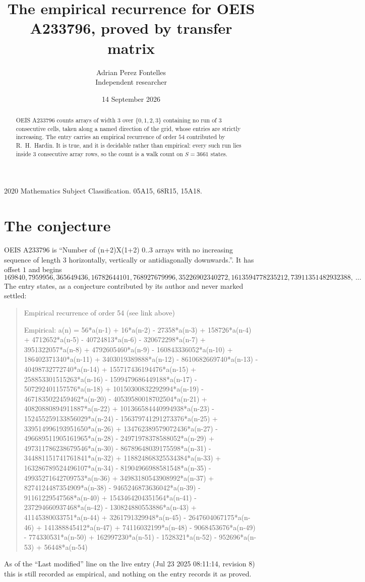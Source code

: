 \documentclass[11pt,a4paper]{article}
\title{The empirical recurrence for OEIS A233796, proved by transfer matrix}
\author{Adrian Perez Fontelles\\ \small Independent researcher}
\date{14 September 2026}
\theoremstyle{plain}
\theoremstyle{definition}
\begin{document}
\maketitle

\begin{abstract}
OEIS A233796 counts arrays of width $3$ over $\{0,1,2,3\}$ containing no run of $3$ consecutive
cells, taken along a named direction of the grid, whose entries are strictly increasing. The entry carries
an empirical recurrence of order $54$ contributed by R.~H.~Hardin. It is true, and it is
decidable rather than empirical: every such run lies inside $3$ consecutive array rows, so
the count is a walk count on $S=3661$ states.
\end{abstract}

\noindent\small 2020 Mathematics Subject Classification. 05A15, 68R15, 15A18.\normalsize

\section{The conjecture}

OEIS A233796 is ``Number of (n+2)X(1+2) 0..3 arrays with no increasing sequence of length 3 horizontally, vertically or antidiagonally downwards.''. It has offset $1$ and begins
\[
169840, 7959956, 365649436, 16782644101, 768927679996, 35226902340272, 1613594778235212, 73911351482932388,\ \dots
\]
The entry states, as a conjecture contributed by its author and never marked settled:
\begin{quote}
Empirical recurrence of order 54 (see link above)

Empirical: a(n) = 56*a(n-1) + 16*a(n-2) - 27358*a(n-3) + 158726*a(n-4) + 4712652*a(n-5) - 40724813*a(n-6) - 320672298*a(n-7) + 3951322057*a(n-8) + 4792605460*a(n-9) - 160843336052*a(n-10) + 186402371340*a(n-11) + 3403019389888*a(n-12) - 8610682669740*a(n-13) - 40498732772740*a(n-14) + 155717436194476*a(n-15) + 258853301515263*a(n-16) - 1599479686449188*a(n-17) - 507292401157576*a(n-18) + 10150300832292994*a(n-19) - 4671835022459462*a(n-20) - 40539580018702504*a(n-21) + 40820880894911887*a(n-22) + 101366584440994938*a(n-23) - 152455259133856029*a(n-24) - 156379741291273376*a(n-25) + 339514996193951650*a(n-26) + 134762389579072436*a(n-27) - 496689511905161965*a(n-28) - 24971978378588052*a(n-29) + 497311786238679546*a(n-30) - 86789648039175598*a(n-31) - 344881151741761841*a(n-32) + 118824868325534384*a(n-33) + 163286789524496107*a(n-34) - 81904966988581548*a(n-35) - 49935271642709753*a(n-36) + 34983180543908992*a(n-37) + 8274124487354909*a(n-38) - 9465246873636042*a(n-39) - 91161229547568*a(n-40) + 1543464204351564*a(n-41) - 237294660937468*a(n-42) - 130824880553886*a(n-43) + 41145380033751*a(n-44) + 3261791329948*a(n-45) - 2647604067175*a(n-46) + 141388845412*a(n-47) + 74116032199*a(n-48) - 9068453676*a(n-49) - 774330531*a(n-50) + 162997230*a(n-51) - 1528321*a(n-52) - 952696*a(n-53) + 56448*a(n-54)
\end{quote}
As of the ``Last modified'' line on the live entry (Jul 23 2025 08:11:14, revision 8) this is still
recorded as empirical, and nothing on the entry records it as proved.
\end{document}
